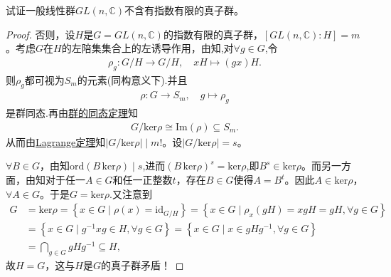 \documentclass[../../main.tex]{subfiles}%
\begin{document}
\begin{example}
试证一般线性群$GL(n,\mathbb{C})$不含有指数有限的真子群。
\end{example}
\begin{proof}

否则，设$H$是$G=GL(n,\mathbb{C})$的指数有限的真子群，$[GL(n,\mathbb{C}):H]=m$。考虑$G$在$H$的左陪集集合上的左诱导作用，由知,对$\forall g\in G$,令
\begin{align*}
\rho_g:G/H\rightarrow G/H,\quad xH\mapsto (gx)H.
\end{align*}
则$\rho_g$都可视为$S_m$的元素(同构意义下).并且
\begin{align*}
\rho:G\rightarrow S_m,\quad g\mapsto \rho_g
\end{align*}
是群同态.再由\hyperref[theorem:群的同态基本定理]{群的同态定理}知
\begin{align*}
G/\mathrm{ker}\rho\cong \mathrm{Im}(\rho)\subseteq S_m.
\end{align*}
从而由\hyperref[theorem:抽象代数--Lagrange定理]{Lagrange定理}知$|G/\mathrm{ker}\rho|\mid m!$。设$|G/\mathrm{ker}\rho|=s$。

$\forall B\in G$，由知$\text{ord}(B\,\mathrm{ker}\rho) \mid s$,进而$(B\,\mathrm{ker}\rho)^s=\mathrm{ker}\rho$,即$B^s\in \mathrm{ker}\rho$。而另一方面，由知对于任一$A\in G$和任一正整数$t$，存在$B\in G$使得$A=B^t$。因此$A\in \mathrm{ker}\rho$，$\forall A\in G$。于是$G=\mathrm{ker}\rho$.又注意到
\begin{align*}
G&=\mathrm{ker}\rho =\left\{ x\in G\mid \rho \left( x \right) =\mathrm{id}_{G/H} \right\} =\left\{ x\in G\mid \rho _x\left( gH \right) =xgH=gH,\forall g\in G \right\} 
\\
&=\left\{ x\in G\mid g^{-1}xg\in H,\forall g\in G \right\} =\left\{ x\in G\mid x\in gHg^{-1},\forall g\in G \right\} 
\\
&=\bigcap_{g\in G}{gHg^{-1}}\subseteq H,
\end{align*}
故$H=G$，这与$H$是$G$的真子群矛盾！


\end{proof}
\end{document}
